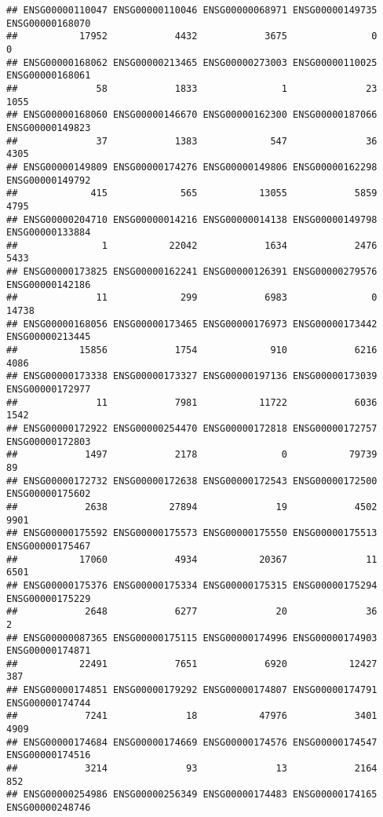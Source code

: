 \documentclass[
]{article}
\begin{document}
\begin{verbatim}
## ENSG00000110047 ENSG00000110046 ENSG00000068971 ENSG00000149735 ENSG00000168070 
##           17952            4432            3675               0               0 
## ENSG00000168062 ENSG00000213465 ENSG00000273003 ENSG00000110025 ENSG00000168061 
##              58            1833               1              23            1055 
## ENSG00000168060 ENSG00000146670 ENSG00000162300 ENSG00000187066 ENSG00000149823 
##              37            1383             547              36            4305 
## ENSG00000149809 ENSG00000174276 ENSG00000149806 ENSG00000162298 ENSG00000149792 
##             415             565           13055            5859            4795 
## ENSG00000204710 ENSG00000014216 ENSG00000014138 ENSG00000149798 ENSG00000133884 
##               1           22042            1634            2476            5433 
## ENSG00000173825 ENSG00000162241 ENSG00000126391 ENSG00000279576 ENSG00000142186 
##              11             299            6983               0           14738 
## ENSG00000168056 ENSG00000173465 ENSG00000176973 ENSG00000173442 ENSG00000213445 
##           15856            1754             910            6216            4086 
## ENSG00000173338 ENSG00000173327 ENSG00000197136 ENSG00000173039 ENSG00000172977 
##              11            7981           11722            6036            1542 
## ENSG00000172922 ENSG00000254470 ENSG00000172818 ENSG00000172757 ENSG00000172803 
##            1497            2178               0           79739              89 
## ENSG00000172732 ENSG00000172638 ENSG00000172543 ENSG00000172500 ENSG00000175602 
##            2638           27894              19            4502            9901 
## ENSG00000175592 ENSG00000175573 ENSG00000175550 ENSG00000175513 ENSG00000175467 
##           17060            4934           20367              11            6501 
## ENSG00000175376 ENSG00000175334 ENSG00000175315 ENSG00000175294 ENSG00000175229 
##            2648            6277              20              36               2 
## ENSG00000087365 ENSG00000175115 ENSG00000174996 ENSG00000174903 ENSG00000174871 
##           22491            7651            6920           12427             387 
## ENSG00000174851 ENSG00000179292 ENSG00000174807 ENSG00000174791 ENSG00000174744 
##            7241              18           47976            3401            4909 
## ENSG00000174684 ENSG00000174669 ENSG00000174576 ENSG00000174547 ENSG00000174516 
##            3214              93              13            2164             852 
## ENSG00000254986 ENSG00000256349 ENSG00000174483 ENSG00000174165 ENSG00000248746 

\end{verbatim}
\end{document}
